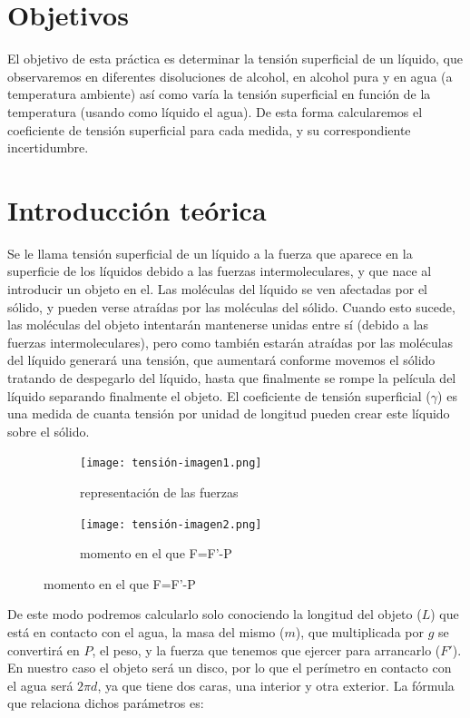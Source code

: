 \documentclass[12pt,a4paper]{book}
\begin{document}
\section{Objetivos}
El objetivo de esta práctica es determinar la tensión superficial de un líquido, que observaremos en diferentes disoluciones de alcohol, en alcohol pura y en agua (a temperatura ambiente) así como varía la tensión superficial en función de la temperatura (usando como líquido el agua). De esta forma calcularemos el coeficiente de tensión superficial para cada medida, y su correspondiente incertidumbre.


\section{Introducción teórica}
Se le llama tensión superficial de un líquido a la fuerza que aparece en la superficie de los líquidos debido a las fuerzas intermoleculares, y que nace al introducir un objeto en el. Las moléculas del líquido se ven afectadas por el sólido, y pueden verse atraídas por las moléculas del sólido. Cuando esto sucede, las moléculas del objeto intentarán mantenerse unidas entre sí (debido a las fuerzas intermoleculares), pero como también estarán atraídas por las moléculas del líquido generará una tensión, que aumentará conforme movemos el sólido tratando de despegarlo del líquido, hasta que finalmente se rompe la película del líquido separando finalmente el objeto. El coeficiente de tensión superficial ($\gamma$)  es una medida de cuanta tensión por unidad de longitud pueden crear este líquido sobre el sólido. 


\begin{figure}[h!]
\centering
\begin{subfigure}[b]{0.4\linewidth}
\texttt{[image: tensión-imagen1.png]}
\caption{representación de las fuerzas}
\label{fig:tension-representacion-fuerzas}
\end{subfigure}
\begin{subfigure}[b]{0.3\linewidth}
\texttt{[image: tensión-imagen2.png]}
\caption{momento en el que F=F'-P}
\label{fig:tensión-punto}
\end{subfigure}
\end{figure}

De este modo podremos calcularlo solo conociendo la longitud del objeto ($L$) que está en contacto con el agua, la masa del mismo ($m$), que multiplicada por $g$ se convertirá en $P$, el peso, y la fuerza que tenemos que ejercer para arrancarlo ($F'$). En nuestro caso el objeto será un disco, por lo que el perímetro en contacto con el agua será $2 \pi d$, ya que tiene dos caras, una interior y otra exterior. La fórmula que relaciona dichos parámetros es:
 
\end{document}
